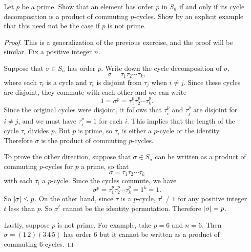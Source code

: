  Let $p$ be a prime. Show that an element has order $p$
in $S_n$ if and only if its cycle decomposition is a product of
commuting $p$-cycles. Show by an explicit example that this need not
be the case if $p$ is not prime.
\begin{proof}
  This is a generalization of the previous exercise, and the proof
  will be similar. Fix a positive integer $n$.

  Suppose that $\sigma\in S_n$ has order $p$. Write down the cycle
  decomposition of $\sigma$,
  \begin{equation*}
    \sigma = \tau_1\tau_2\cdots\tau_k,
  \end{equation*}
  where each $\tau_i$ is a cycle and $\tau_i$ is disjoint from
  $\tau_j$ when $i\neq j$. Since these cycles are disjoint, they
  commute with each other and we can write
  \begin{equation*}
    1 = \sigma^p = \tau_1^p\tau_2^p\cdots\tau_k^p.
  \end{equation*}
  Since the original cycles were disjoint, it follows that $\tau_i^p$
  and $\tau_j^p$ are disjoint for $i\neq j$, and we must have
  $\tau_i^p = 1$ for each $i$. This implies that the length of the
  cycle $\tau_i$ divides $p$. But $p$ is prime, so $\tau_i$ is either
  a $p$-cycle or the identity. Therefore $\sigma$ is the product of
  commuting $p$-cycles.

  To prove the other direction, suppose that $\sigma\in S_n$ can be
  written as a product of commuting $p$-cycles for $p$ a prime, so
  that
  \begin{equation*}
    \sigma = \tau_1\tau_2\cdots\tau_k
  \end{equation*}
  with each $\tau_i$ a $p$-cycle. Since the cycles commute, we have
  \begin{equation*}
    \sigma^p = \tau_1^p\tau_2^p\cdots\tau_k^p = 1^k = 1.
  \end{equation*}
  So $\lvert{\sigma}\rvert \leq p$. On the other hand, since $\tau$ is a
  $p$-cycle, $\tau^t\neq 1$ for any positive integer $t$ less than
  $p$. So $\sigma^t$ cannot be the identity permutation. Therefore
  $\lvert{\sigma}\rvert = p$.

  Lastly, suppose $p$ is not prime. For example, take $p = 6$ and
  $n = 6$. Then $\sigma = (1\,2)(3\,4\,5)$ has order $6$ but it cannot
  be written as a product of commuting $6$-cycles.
\end{proof}

